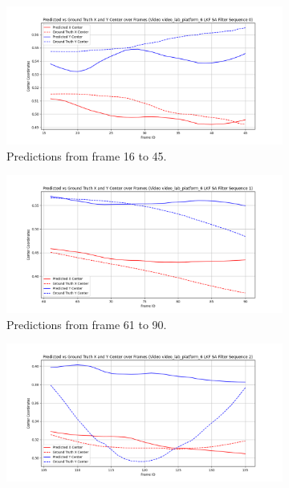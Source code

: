 \documentclass[12pt,oneside]{book} %
\begin{document}
\begin{figure}[H]
    \centering
    \begin{subfigure}[t]{0.45\textwidth}
        \includegraphics[width=\textwidth]{figures/framework/video_lab_platform_6 LKF SA Filter - 0.png}
        \caption{Predictions from frame 16 to 45.}
        \label{fig:framework-video_lab_platform_6-savgol-0}
    \end{subfigure}
    \hfill
    \begin{subfigure}[t]{0.45\textwidth}
        \includegraphics[width=\textwidth]{figures/framework/video_lab_platform_6 LKF SA Filter - 1.png}
        \caption{Predictions from frame 61 to 90.}
        \label{fig:framework-video_lab_platform_6-savgol-1}
    \end{subfigure}
    \vfill
    \begin{subfigure}[t]{0.45\textwidth}
        \includegraphics[width=\textwidth]{figures/framework/video_lab_platform_6 LKF SA Filter - 2.png}

\end{subfigure}
\end{figure}
\end{document}
